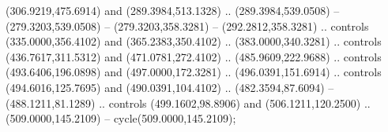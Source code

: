 {{\begin{scope}[y=-0.80pt,x=0.80pt,scale=0.038,xshift=-228pt,yshift=430pt]
        (306.9219,475.6914) and (289.3984,513.1328) .. (289.3984,539.0508) --
        (279.3203,539.0508) -- (279.3203,358.3281) -- (292.2812,358.3281) .. controls
        (335.0000,356.4102) and (365.2383,350.4102) .. (383.0000,340.3281) .. controls
        (436.7617,311.5312) and (471.0781,272.4102) .. (485.9609,222.9688) .. controls
        (493.6406,196.0898) and (497.0000,172.3281) .. (496.0391,151.6914) .. controls
        (494.6016,125.7695) and (490.0391,104.4102) .. (482.3594,87.6094) --
        (488.1211,81.1289) .. controls (499.1602,98.8906) and (506.1211,120.2500) ..
        (509.0000,145.2109) -- cycle(509.0000,145.2109);
    \end{scope}
  }
}
